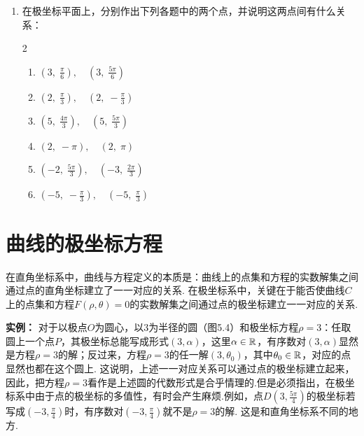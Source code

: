 \begin{enumerate}
\item 在极坐标平面上，分别作出下列各题中的两个点，并说明这两点间有什么关系：
\begin{multicols}{2}
\begin{enumerate}[(1)]
    \item $\left(3,\;\frac{\pi}{6}\right),\quad \left(3,\;\frac{5\pi}{6}\right)$
    \item $\left(2,\;\frac{\pi}{3}\right),\quad \left(2,\;-\frac{\pi}{3}\right)$
    \item $\left(5,\;\frac{4\pi}{3}\right),\quad \left(5,\;\frac{5\pi}{3}\right)$
    \item $\left(2,\; -\pi\right),\quad \left(2,\; \pi\right)$
    \item $\left(-2,\;\frac{5\pi}{3}\right),\quad \left(-3,\;\frac{2\pi}{3}\right)$
    \item $\left(-5,\;-\frac{\pi}{3}\right),\quad \left(-5,\;\frac{\pi}{3}\right)$
\end{enumerate}
\end{multicols}
\end{enumerate}

\section{曲线的极坐标方程}

在直角坐标系中，曲线与方程定义的本质是：曲线上的点集和方程的实数解集之间通过点的直角坐标建立了一一对应的关系. 在极坐标系中，关键在于能否使曲线$C$上的点集和方程$F(\rho,\theta)=0$的实数解集之间通过点的极坐标建立一一对应的关系.

\begin{figure}[htp]
    \centering
{}
    \caption{}
\end{figure}


\textbf{实例：}
 对于以极点$O$为圆心，以3为半径的圆（图5.4）和极坐标方程$\rho=3$：任取圆上一个点$P$，其极坐标总能写成形式$(3,\alpha)$，这里$\alpha\in\mathbb{R}$，有序数对$(3,\alpha)$显然是方程$\rho=3$的解；反过来，方程$\rho=3$的任一解$(3,\theta_0)$，其中$\theta_0\in\mathbb{R}$，对应的点显然也都在这个圆上. 这说明，上述一一对应关系可以通过点的极坐标建立起来，因此，把方程$\rho=3$看作是上述圆的代数形式是合乎情理的.但是必须指出，在极坐标系中由于点的极坐标的多值性，有时会产生麻烦.例如，点$D\left(3,\frac{5\pi}{4}\right)$的极坐标若写成$\left(-3,\frac{\pi}{4}\right)$时，有序数对$\left(-3,\frac{\pi}{4}\right)$就不是$\rho=3$的解. 这是和直角坐标系不同的地方.


